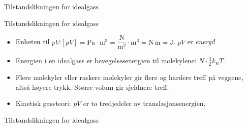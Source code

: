 \documentclass[aspectratio=169, 12pt]{beamer}
\begin{document}
\begin{frame}{Tilstandslikningen for idealgass}

  \pause

\end{frame}

\begin{frame}{Tilstandslikningen for idealgass}

  \begin{itemize}
    \item<1-> Enheten til $pV$:\quad $[pV] = \mathrm{Pa}\cdot\mathrm{m^3} = \dfrac{\mathrm{N}}{\mathrm{m^2}}\cdot\mathrm{m^3} = \mathrm{N\,m} = \mathrm{J}$. \quad $pV$ er \textit{energi}!
    \item<2-> Energien i en idealgass er bevegelsesenergien til molekylene: $N\cdot\tfrac{3}{2}k_\text{B}T$.
    \item<3-> Flere molekyler eller raskere molekyler gir flere og hardere treff på veggene, altså høyere trykk. Større volum gir sjeldnere treff.
    \item<4-> Kinetisk gassteori: $pV$ er to tredjedeler av translasjonsenergien,
  \end{itemize}

\end{frame}

\begin{frame}{Tilstandslikningen for idealgass}

  \pause

\end{frame}
\end{document}

